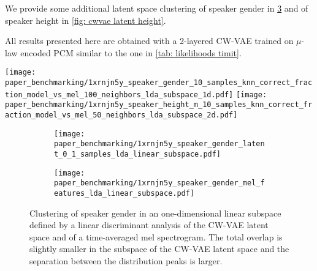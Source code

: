 {We provide some additional latent space clustering of speaker gender in \cref{fig: latent space visualization gender} and of speaker height in \cref{fig: cwvae latent height}.

All results presented here are obtained with a 2-layered CW-VAE trained on $\mu$-law encoded PCM similar to the one in \cref{tab: likelihoods timit}.

\begin{figure*}[t!]
    \centering
    \texttt{[image: paper\_benchmarking/1xrnjn5y\_speaker\_gender\_10\_samples\_knn\_correct\_fraction\_model\_vs\_mel\_100\_neighbors\_lda\_subspace\_1d.pdf]}
    \hfill
    \texttt{[image: paper\_benchmarking/1xrnjn5y\_speaker\_height\_m\_10\_samples\_knn\_correct\_fraction\_model\_vs\_mel\_50\_neighbors\_lda\_subspace\_2d.pdf]}
    \caption[Leave-one-out $k$-nearest-neighbour accuracy for speaker gender and height]{
    Leave-one-out $k$-nearest-neighbor accuracy with different $k$ for
    (a) the speaker's gender and
    (b) the height of male speakers (female speakers yield a similar result).
    }
    \label{fig: knn fraction latent space height and gender}
\end{figure*}
\begin{figure}[t!]
     \centering
     \hfill
     \begin{subfigure}[b]{0.48\textwidth}
         \centering
         \texttt{[image: paper\_benchmarking/1xrnjn5y\_speaker\_gender\_latent\_0\_1\_samples\_lda\_linear\_subspace.pdf]}
         \caption{}
         \label{fig: latent space gender}
     \end{subfigure}
     \hfill
     \begin{subfigure}[b]{0.48\textwidth}
         \centering
         \texttt{[image: paper\_benchmarking/1xrnjn5y\_speaker\_gender\_mel\_features\_lda\_linear\_subspace.pdf]}
         \caption{}
         \label{fig: mel features gender}
     \end{subfigure}
    \caption[Clustering of speaker gender in 1D linear subspace of a CW-VAE latent space and a time-averaged mel spectrogram.]{Clustering of speaker gender in an one-dimensional linear subspace defined by a linear discriminant analysis of the CW-VAE latent space and of a time-averaged mel spectrogram. The total overlap is slightly smaller in the subspace of the CW-VAE latent space and the separation between the distribution peaks is larger.}
    \label{fig: latent space visualization gender}
\end{figure}


}
